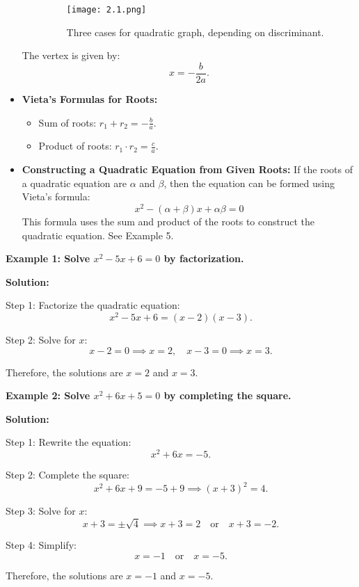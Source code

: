 \begin{itemize}
\begin{itemize}
        \begin{figure}[h!]
     \centering
    \texttt{[image: 2.1.png]}
    \caption{Three cases for quadratic graph, depending on discriminant.}
    \label{fig:your-label}
\end{figure}
    \end{itemize}
    The vertex is given by:
    \[
    x = -\frac{b}{2a}.
    \]
    \item \textbf{Vieta's Formulas for Roots:}
    \begin{itemize}
        \item Sum of roots: $r_1 + r_2 = -\frac{b}{a}$.
        \item Product of roots: $r_1 \cdot r_2 = \frac{c}{a}$.
    \end{itemize}
    \item \textbf{Constructing a Quadratic Equation from Given Roots:}  
If the roots of a quadratic equation are \( \alpha \) and \( \beta \), then the equation can be formed using Vieta's formula:
\[
x^2 - (\alpha + \beta)x + \alpha\beta = 0
\]
This formula uses the sum and product of the roots to construct the quadratic equation. See Example 5.

\end{itemize}

\begin{flushleft}
\textbf{Example 1: Solve $x^2 - 5x + 6 = 0$ by factorization.}

\vspace{0.5cm}
\textbf{Solution:}
\vspace{0.5cm}

Step 1: Factorize the quadratic equation:
\[
x^2 - 5x + 6 = (x - 2)(x - 3).
\]

Step 2: Solve for $x$:
\[
x - 2 = 0 \implies x = 2, \quad x - 3 = 0 \implies x = 3.
\]

Therefore, the solutions are $x = 2$ and $x = 3$.
\end{flushleft}

\begin{flushleft}
\textbf{Example 2: Solve $x^2 + 6x + 5 = 0$ by completing the square.}

\vspace{0.5cm}
\textbf{Solution:}
\vspace{0.5cm}

Step 1: Rewrite the equation:
\[
x^2 + 6x = -5.
\]

Step 2: Complete the square:
\[
x^2 + 6x + 9 = -5 + 9 \implies (x + 3)^2 = 4.
\]

Step 3: Solve for $x$:
\[
x + 3 = \pm \sqrt{4} \implies x + 3 = 2 \quad \text{or} \quad x + 3 = -2.
\]

Step 4: Simplify:
\[
x = -1 \quad \text{or} \quad x = -5.
\]

Therefore, the solutions are $x = -1$ and $x = -5$.
\end{flushleft}

